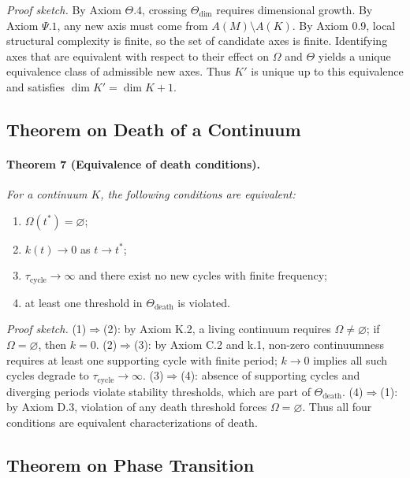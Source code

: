 \emph{Proof sketch.}
By Axiom \(\Theta.4\), crossing \(\Theta_{\mathrm{dim}}\) requires dimensional growth.
By Axiom \(\Psi.1\), any new axis must come from \(A(M)\setminus A(K)\).
By Axiom 0.9, local structural complexity is finite, so the set of candidate axes is finite.
Identifying axes that are equivalent with respect to their effect on \(\Omega\) and \(\Theta\) yields a unique equivalence class of admissible new axes.
Thus \(K'\) is unique up to this equivalence and satisfies \(\dim K'=\dim K+1\).

\subsection{Theorem on Death of a Continuum}

\paragraph{Theorem 7 (Equivalence of death conditions).}
\emph{For a continuum \(K\), the following conditions are equivalent:}
\begin{enumerate}
  \item \(\Omega(t^*)=\varnothing\);
  \item \(k(t)\to 0\) as \(t\to t^*\);
  \item \(\tau_{\mathrm{cycle}}\to\infty\) and there exist no new cycles with finite frequency;
  \item at least one threshold in \(\Theta_{\mathrm{death}}\) is violated.
\end{enumerate}

\emph{Proof sketch.}
(1)\(\Rightarrow\)(2): by Axiom K.2, a living continuum requires \(\Omega\neq\varnothing\); if \(\Omega=\varnothing\), then \(k=0\).
(2)\(\Rightarrow\)(3): by Axiom C.2 and k.1, non-zero continuumness requires at least one supporting cycle with finite period; \(k\to 0\) implies all such cycles degrade to \(\tau_{\mathrm{cycle}}\to\infty\).
(3)\(\Rightarrow\)(4): absence of supporting cycles and diverging periods violate stability thresholds, which are part of \(\Theta_{\mathrm{death}}\).
(4)\(\Rightarrow\)(1): by Axiom D.3, violation of any death threshold forces \(\Omega=\varnothing\).
Thus all four conditions are equivalent characterizations of death.

\subsection{Theorem on Phase Transition}

